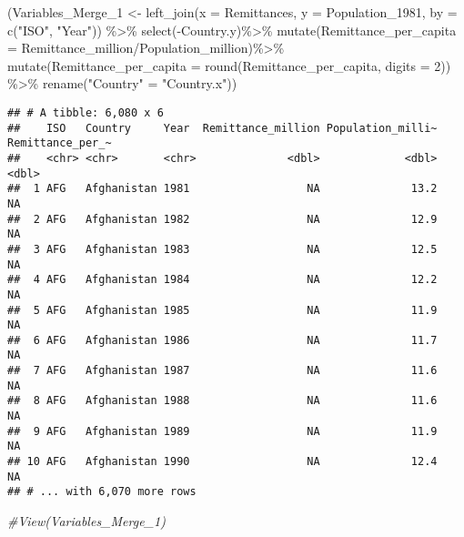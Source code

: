 \documentclass[
]{article}
\newenvironment{Shaded}{\begin{snugshade}}{\end{snugshade}}
\newcommand{\AttributeTok}[1]{\textcolor[rgb]{0.77,0.63,0.00}{#1}}
\newcommand{\CommentTok}[1]{\textcolor[rgb]{0.56,0.35,0.01}{\textit{#1}}}
\newcommand{\DecValTok}[1]{\textcolor[rgb]{0.00,0.00,0.81}{#1}}
\newcommand{\FunctionTok}[1]{\textcolor[rgb]{0.00,0.00,0.00}{#1}}
\newcommand{\NormalTok}[1]{#1}
\newcommand{\OtherTok}[1]{\textcolor[rgb]{0.56,0.35,0.01}{#1}}
\newcommand{\SpecialCharTok}[1]{\textcolor[rgb]{0.00,0.00,0.00}{#1}}
\newcommand{\StringTok}[1]{\textcolor[rgb]{0.31,0.60,0.02}{#1}}
\begin{document}
\begin{Shaded}
\begin{Highlighting}[]
\NormalTok{(Variables\_Merge\_1 }\OtherTok{\textless{}{-}} \FunctionTok{left\_join}\NormalTok{(}\AttributeTok{x =}\NormalTok{ Remittances, }\AttributeTok{y =}\NormalTok{ Population\_1981, }\AttributeTok{by =} \FunctionTok{c}\NormalTok{(}\StringTok{"ISO"}\NormalTok{, }\StringTok{"Year"}\NormalTok{)) }\SpecialCharTok{\%\textgreater{}\%}
  \FunctionTok{select}\NormalTok{(}\SpecialCharTok{{-}}\NormalTok{Country.y)}\SpecialCharTok{\%\textgreater{}\%}
  \FunctionTok{mutate}\NormalTok{(}\AttributeTok{Remittance\_per\_capita =}\NormalTok{ Remittance\_million}\SpecialCharTok{/}\NormalTok{Population\_million)}\SpecialCharTok{\%\textgreater{}\%}
  \FunctionTok{mutate}\NormalTok{(}\AttributeTok{Remittance\_per\_capita =} \FunctionTok{round}\NormalTok{(Remittance\_per\_capita, }\AttributeTok{digits =} \DecValTok{2}\NormalTok{)) }\SpecialCharTok{\%\textgreater{}\%}
  \FunctionTok{rename}\NormalTok{(}\StringTok{"Country"} \OtherTok{=} \StringTok{"Country.x"}\NormalTok{))}
\end{Highlighting}
\end{Shaded}

\begin{verbatim}
## # A tibble: 6,080 x 6
##    ISO   Country     Year  Remittance_million Population_milli~ Remittance_per_~
##    <chr> <chr>       <chr>              <dbl>             <dbl>            <dbl>
##  1 AFG   Afghanistan 1981                  NA              13.2               NA
##  2 AFG   Afghanistan 1982                  NA              12.9               NA
##  3 AFG   Afghanistan 1983                  NA              12.5               NA
##  4 AFG   Afghanistan 1984                  NA              12.2               NA
##  5 AFG   Afghanistan 1985                  NA              11.9               NA
##  6 AFG   Afghanistan 1986                  NA              11.7               NA
##  7 AFG   Afghanistan 1987                  NA              11.6               NA
##  8 AFG   Afghanistan 1988                  NA              11.6               NA
##  9 AFG   Afghanistan 1989                  NA              11.9               NA
## 10 AFG   Afghanistan 1990                  NA              12.4               NA
## # ... with 6,070 more rows
\end{verbatim}

\begin{Shaded}
\begin{Highlighting}[]
\CommentTok{\#View(Variables\_Merge\_1)}
\end{Highlighting}
\end{Shaded}
\end{document}
